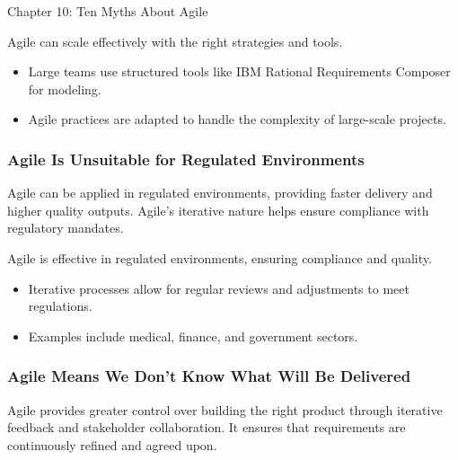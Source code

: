 \begin{notes}{Chapter 10: Ten Myths About Agile}
    \begin{highlight}
    
        Agile can scale effectively with the right strategies and tools.
        
        \begin{itemize}
            \item Large teams use structured tools like IBM Rational Requirements Composer for modeling.
            \item Agile practices are adapted to handle the complexity of large-scale projects.
        \end{itemize}
    
    \end{highlight}
    
    \subsubsection*{Agile Is Unsuitable for Regulated Environments}
    
    Agile can be applied in regulated environments, providing faster delivery and higher quality outputs. Agile's iterative nature helps ensure compliance with regulatory mandates.
    
    \begin{highlight}
    
        Agile is effective in regulated environments, ensuring compliance and quality.
        
        \begin{itemize}
            \item Iterative processes allow for regular reviews and adjustments to meet regulations.
            \item Examples include medical, finance, and government sectors.
        \end{itemize}
    
    \end{highlight}
    
    \subsubsection*{Agile Means We Don't Know What Will Be Delivered}
    
    Agile provides greater control over building the right product through iterative feedback and stakeholder collaboration. It ensures that requirements are continuously refined and agreed upon.
    

\end{notes}
